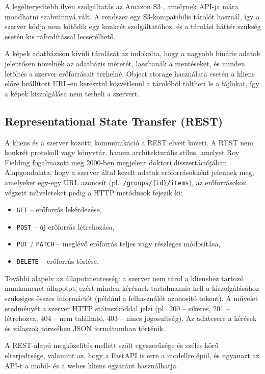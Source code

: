 A legelterjedtebb ilyen szolgáltatás az Amazon S3 \cite{S3}, amelynek API-ja mára mondhatni szabvánnyá vált. A rendszer egy S3-kompatibilis tárolót használ, így a szerver kódja nem kötődik egy konkrét szolgáltatóhoz, és a tárolási háttér szükség esetén kis ráfordítással lecserélhető.

A képek adatbázison kívüli tárolását az indokolta, hogy a nagyobb bináris adatok jelentősen növelnék az adatbázis méretét, lassítanák a mentéseket, és minden letöltés a szerver erőforrásait terhelné. Object storage használata esetén a kliens előre beállított URL-en keresztül közvetlenül a tárolóból töltheti le a fájlokat, így a képek kiszolgálása nem terheli a szervert.

\subsection{Representational State Transfer (REST)}

A kliens és a szerver közötti kommunikáció a REST \cite{REST} elveit követi. A REST nem konkrét protokoll vagy könyvtár, hanem architekturális stílus, amelyet Roy Fielding fogalmazott meg 2000-ben megjelent doktori disszertációjában \cite{Fielding}. Alapgondolata, hogy a szerver által kezelt adatok erőforrásokként jelennek meg, amelyeket egy-egy URL azonosít (pl.\ \texttt{/groups/\{id\}/items}), az erőforrásokon végzett műveleteket pedig a HTTP metódusok fejezik ki:

\begin{itemize}
	\item \texttt{GET} -- erőforrás lekérdezése,
	\item \texttt{POST} -- új erőforrás létrehozása,
	\item \texttt{PUT} / \texttt{PATCH} -- meglévő erőforrás teljes vagy részleges módosítása,
	\item \texttt{DELETE} -- erőforrás törlése.
\end{itemize}

További alapelv az állapotmentesség: a szerver nem tárol a klienshez tartozó munkamenet-állapotot, ezért minden kérésnek tartalmaznia kell a kiszolgálásához szükséges összes információt (például a felhasználót azonosító tokent). A művelet eredményét a szerver HTTP státuszkóddal jelzi (pl.\ 200 -- sikeres, 201 -- létrehozva, 404 -- nem található, 403 -- nincs jogosultság). Az adatcsere a kérések és válaszok törzsében JSON formátumban történik.

A REST-alapú megközelítés mellett szólt egyszerűsége és széles körű elterjedtsége, valamint az, hogy a FastAPI is erre a modellre épül, és ugyanazt az API-t a mobil- és a webes kliens egyaránt használhatja.

